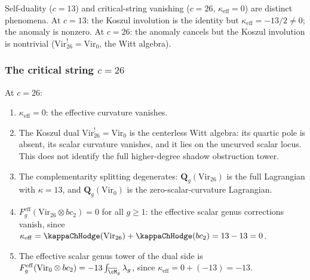 \begin{remark}[$c = 13$ is not the critical string]
\label{rem:gravity-13-not-critical}
Self-duality ($c = 13$) and critical-string vanishing
($c = 26$, $\kappa_{\mathrm{eff}} = 0$) are distinct
phenomena. At $c = 13$: the Koszul involution is the identity
but $\kappa_{\mathrm{eff}} = -13/2 \ne 0$; the anomaly is
nonzero. At $c = 26$: the anomaly cancels but the Koszul
involution is nontrivial ($\mathrm{Vir}_{26}^! =
\mathrm{Vir}_0$, the Witt algebra).
\end{remark}

\subsubsection*{The critical string $c = 26$}

\begin{proposition}[Anomaly cancellation at $c = 26$;
\ClaimStatusProvedHere]
\label{prop:gravity-c26-anomaly-cancellation}
At $c = 26$:
\begin{enumerate}[label=\textup{(\roman*)}]
\item $\kappa_{\mathrm{eff}} = 0$: the effective curvature
 vanishes.
\item The Koszul dual $\mathrm{Vir}_{26}^!
 = \mathrm{Vir}_0$ is the centerless Witt algebra: its quartic
 pole is absent, its scalar curvature vanishes, and it lies on the
 uncurved scalar locus. This does not identify the full
 higher-degree shadow obstruction tower.
\item The complementarity splitting degenerates:
 $\mathbf{Q}_g(\mathrm{Vir}_{26})$ is the full Lagrangian
 with $\kappa = 13$, and $\mathbf{Q}_g(\mathrm{Vir}_0)$
 is the zero-scalar-curvature Lagrangian.
\item $F_g^{\mathrm{eff}}(\mathrm{Vir}_{26} \otimes bc_2) = 0$ for all $g \ge 1$:
 the effective scalar genus corrections vanish,
 since $\kappa_{\mathrm{eff}} = \kappaChHodge(\mathrm{Vir}_{26}) + \kappaChHodge(bc_2)
 = 13 - 13 = 0$.
\item The effective scalar genus tower of the dual side is
 $F_g^{\mathrm{eff}}(\mathrm{Vir}_0 \otimes bc_2) = -13 \int_{\overline{\cM}_g}
 \lambda_g$, since $\kappa_{\mathrm{eff}} = 0 + (-13) = -13$.
\end{enumerate}
\end{proposition}


